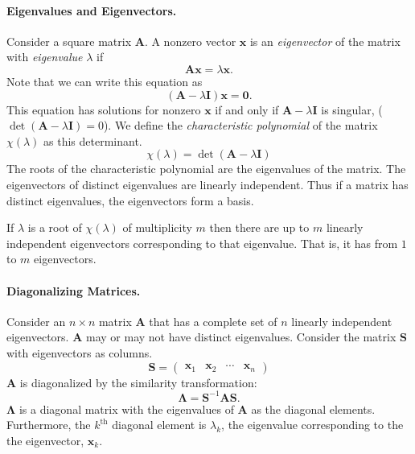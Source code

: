 \paragraph{Eigenvalues and Eigenvectors.}
Consider a square matrix $\mathbf{A}$.
A nonzero vector $\mathbf{x}$ is an \textit{eigenvector} of the matrix with 
\textit{eigenvalue} $\lambda$ if 
\[
\mathbf{A} \mathbf{x} = \lambda \mathbf{x}.
\]
Note that we can write this equation as
\[
(\mathbf{A} - \lambda \mathbf{I}) \mathbf{x} = \mathbf{0}.
\]
This equation has solutions for nonzero $\mathbf{x}$ if and only if 
$\mathbf{A} - \lambda \mathbf{I}$ is singular, ($\det(\mathbf{A} - \lambda \mathbf{I}) = 0$).
We define the \textit{characteristic polynomial} of the matrix $\chi(\lambda)$ as 
this determinant.
\[
\chi(\lambda) = \det(\mathbf{A} - \lambda \mathbf{I})
\]
The roots of the characteristic polynomial are the eigenvalues of the matrix.
The eigenvectors of distinct eigenvalues are linearly independent.  
Thus if a matrix has distinct eigenvalues, the eigenvectors form a basis.

If $\lambda$ is a root of $\chi(\lambda)$ of multiplicity $m$ then there 
are up to $m$ linearly independent eigenvectors corresponding to that 
eigenvalue.  That is, it has from $1$ to $m$ eigenvectors.





\paragraph{Diagonalizing Matrices.}
Consider an $n \times n$ matrix $\mathbf{A}$ that has a complete set of $n$ 
linearly independent eigenvectors.  $\mathbf{A}$ may or may not have distinct
eigenvalues.  Consider the matrix $\mathbf{S}$ with eigenvectors as columns.
\[
\mathbf{S} =
\begin{pmatrix}
  \mathbf{x}_1 & \mathbf{x}_2 & \cdots & \mathbf{x}_n 
\end{pmatrix}
\]
$\mathbf{A}$ is diagonalized by the similarity transformation:
\[
\boldsymbol{\Lambda} = \mathbf{S}^{-1} \mathbf{A} \mathbf{S}.
\]
$\boldsymbol{\Lambda}$ is a diagonal matrix with the eigenvalues of $\mathbf{A}$ as the 
diagonal elements.  Furthermore, the $k^{\mathrm{th}}$ diagonal element
is $\lambda_k$, the eigenvalue corresponding to the the eigenvector,
$\mathbf{x}_k$.






